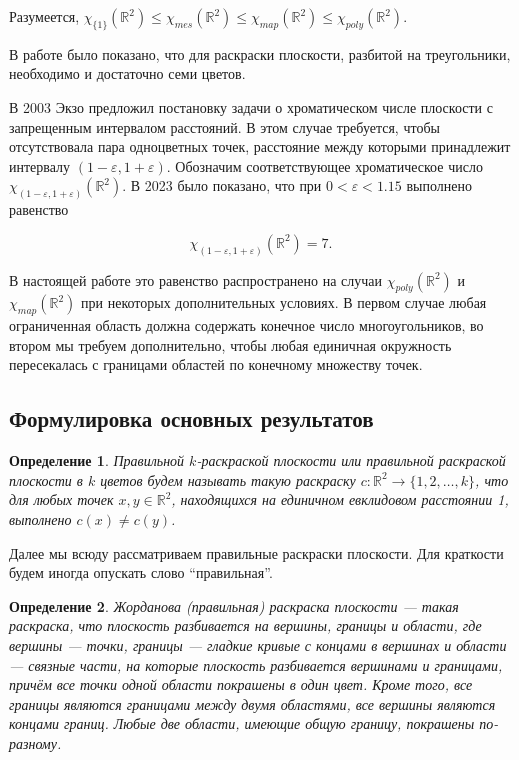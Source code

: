 \documentclass[12pt,a4paper]{article}
\newtheorem{mydef}{Определение}
\begin{document}
Разумеется,
$\chi_{\{1\}}(\mathbb{R}^2) \leq \chi_{mes}(\mathbb{R}^2) \leq \chi_{map}(\mathbb{R}^2) \leq \chi_{poly}(\mathbb{R}^2) $.

В работе \cite{manta2021triangle} было показано, что для раскраски плоскости, разбитой на треугольники, необходимо и достаточно семи цветов.

В 2003 Экзо предложил постановку задачи о хроматическом числе плоскости с запрещенным интервалом расстояний. В этом случае требуется, чтобы отсутствовала пара одноцветных точек, расстояние между которыми принадлежит интервалу $(1 - \varepsilon, 1+\varepsilon)$. Обозначим соответствующее хроматическое число $\chi_{(1 - \varepsilon, 1+\varepsilon)}(\mathbb{R}^2)$. В 2023 было показано, что при  $0<\varepsilon<1.15$ выполнено  равенство 

\[
    \chi_{(1 - \varepsilon, 1+\varepsilon)}(\mathbb{R}^2)=7.
\]

В настоящей работе это равенство распространено на случаи $\chi_{poly}(\mathbb{R}^2)$ и $\chi_{map}(\mathbb{R}^2)$ при некоторых дополнительных условиях. В первом случае любая ограниченная область должна содержать конечное число многоугольников, во втором мы требуем дополнительно, чтобы любая единичная окружность пересекалась с границами областей по конечному множеству точек.

\subsection{Формулировка основных результатов}

\begin{mydef}
    Правильной $k$-раскраской плоскости или правильной раскраской плоскости в $k$ цветов будем называть такую раскраску $c: \mathbb{R}^2 \to \{ 1,2, \dots , k\}$, что для любых точек $x,y \in \mathbb{R}^2$, находящихся на единичном евклидовом расстоянии 1, выполнено $c(x) \neq c(y)$. 
\end{mydef}

Далее мы всюду рассматриваем правильные раскраски плоскости. Для краткости будем иногда опускать слово ``правильная''.

\begin{mydef}
    Жорданова (правильная) раскраска плоскости --- такая раскраска, что %
    плоскость разбивается на вершины, границы и области, где вершины --- точки, границы --- гладкие кривые с концами в вершинах и области --- связные части, на которые плоскость разбивается вершинами и границами, причём все точки одной области покрашены в один цвет. Кроме того, все границы являются границами между двумя областями, все вершины являются концами границ. Любые две области, имеющие общую границу, покрашены по-разному.
\end{mydef}
\end{document}
